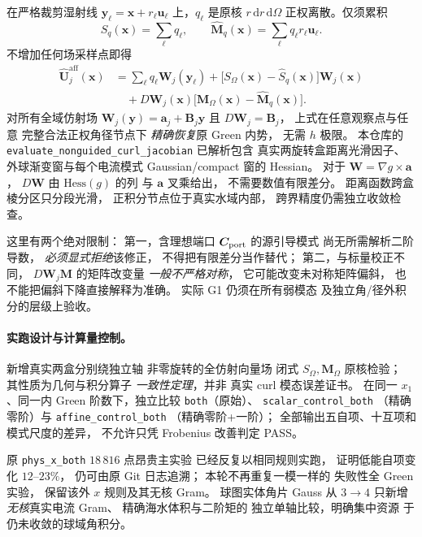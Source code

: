 在严格裁剪湿射线
$\bm y_\ell=\bm x+r_\ell\bm u_\ell$
上，$q_\ell$ 是原核
$r\,\mathrm dr\,\mathrm d\Omega$
正权离散。仅须累积
\[
 \hat S_q(\bm x)=\sum_\ell q_\ell,\qquad
 \hat{\bm M}_q(\bm x)=
     \sum_\ell q_\ell r_\ell\bm u_\ell .
\]
不增加任何场采样点即得
\begin{align}
 \widehat{\bm U}_j^\mathrm{aff}(\bm x)
 &=\sum_\ell q_\ell\bm W_j(\bm y_\ell)
  +\bigl[S_\Omega(\bm x)-\hat S_q(\bm x)\bigr]
       \bm W_j(\bm x) \nonumber\\
 &\quad+
 D\bm W_j(\bm x)
 \bigl[\bm M_\Omega(\bm x)
       -\hat{\bm M}_q(\bm x)\bigr].
 \label{eq:p1-c-affine-control-implemented}
\end{align}
对所有全域仿射场
$\bm W_j(\bm y)=\bm a_j+\bm B_j\bm y$
且 $D\bm W_j=\bm B_j$，
上式在任意观察点与任意
完整合法正权角径节点下
\emph{精确恢复}原 Green 内势，
无需 $h$ 极限。
本仓库的
\texttt{evaluate\_nonguided\_curl\_jacobian}
已解析包含
真实两旋转盒距离光滑因子、
外球渐变窗与每个电流模式
Gaussian/compact 窗的 Hessian。
对于
$\bm W=\nabla g\times\bm a$，
$D\bm W$ 由
$\mathrm{Hess}(g)$ 的列
与 $\bm a$ 叉乘给出，
不需要数值有限差分。
距离函数跨盒棱分区只分段光滑，
正积分节点位于真实水域内部，
跨界精度仍需独立收敛检查。

这里有两个绝对限制：
第一，含理想端口
$\bm C_{\rm port}$ 的源引导模式
尚无所需解析二阶导数，
\emph{必须显式拒绝}该修正，
不得把有限差分当作替代；
第二，与标量校正不同，
$D\bm W_j\bm M$ 的矩阵改变量
\emph{一般不严格对称}，
它可能改变未对称矩阵偏斜，
也不能把偏斜下降直接解释为准确。
实际 G1 仍须在所有弱模态
及独立角/径外积分的层级上验收。

\paragraph{实跑设计与计算量控制。}
新增真实两盒分别绕独立轴
非零旋转的全仿射向量场
闭式 $S_\Omega,\bm M_\Omega$
原核检验；
其性质为几何与积分算子
\emph{一致性定理}，并非
真实 curl 模态误差证书。
在同一 $x_1$、同一内 Green
阶数下，独立比较
\texttt{both}（原始）、
\texttt{scalar\_control\_both}
（精确零阶）与
\texttt{affine\_control\_both}
（精确零阶+一阶）；
全部输出五自项、十互项和
模式尺度的差异，
不允许只凭 Frobenius 改善判定 PASS。

原 \texttt{phys\_x\_both}
$18\,816$ 点昂贵主实验
已经反复以相同规则实跑，
证明低能自项变化 $12$--$23\%$，
仍可由原 Git 日志追溯；
本轮不再重复一模一样的
失败性全 Green 实验，
保留该外 $x$ 规则及其无核 Gram。
球图实体角片 Gauss 从 $3\to4$
只新增\emph{无核}真实电流 Gram、
精确海水体积与二阶矩的
独立单轴比较，明确集中资源
于仍未收敛的球域角积分。

